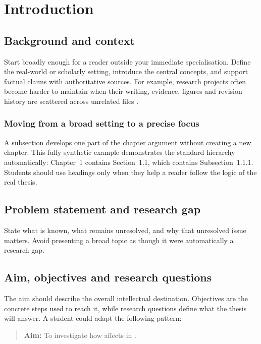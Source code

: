 \chapter{Introduction}
\label{chap:introduction}


\section{Background and context}
Start broadly enough for a reader outside your immediate specialisation. Define the
real-world or scholarly setting, introduce the central concepts, and support factual
claims with authoritative sources. For example, research projects often become harder
to maintain when their writing, evidence, figures and revision history are scattered
across unrelated files \citep{knuth1984texbook}.

\subsection{Moving from a broad setting to a precise focus}
A subsection develops one part of the chapter argument without creating a new chapter.
This fully synthetic example demonstrates the standard hierarchy automatically:
Chapter~1 contains Section~1.1, which contains Subsection~1.1.1. Students should use
headings only when they help a reader follow the logic of the real thesis.

\section{Problem statement and research gap}
State what is known, what remains unresolved, and why that unresolved issue matters.
Avoid presenting a broad topic as though it were automatically a research gap.


\section{Aim, objectives and research questions}
The aim should describe the overall intellectual destination. Objectives are the
concrete steps used to reach it, while research questions define what the thesis will
answer. A student could adapt the following pattern:
\begin{quote}
\textbf{Aim:} To investigate how  affects
 in .
\end{quote}

